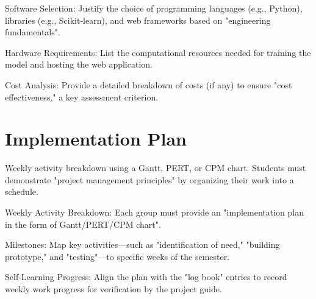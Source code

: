 Software Selection: Justify the choice of programming languages (e.g., Python), libraries (e.g., Scikit-learn), and web frameworks based on "engineering fundamentals".

Hardware Requirements: List the computational resources needed for training the model and hosting the web application.

Cost Analysis: Provide a detailed breakdown of costs (if any) to ensure "cost effectiveness," a key assessment criterion.

\section{Implementation Plan}
Weekly activity breakdown using a Gantt, PERT, or CPM chart.
Students must demonstrate "project management principles" by organizing their work into a schedule.

Weekly Activity Breakdown: Each group must provide an "implementation plan in the form of Gantt/PERT/CPM chart".

Milestones: Map key activities—such as "identification of need," "building prototype," and "testing"—to specific weeks of the semester.

Self-Learning Progress: Align the plan with the "log book" entries to record weekly work progress for verification by the project guide.

